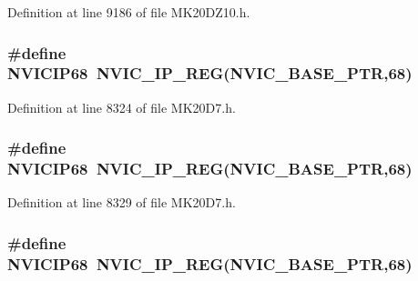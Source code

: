 Definition at line 9186 of file M\+K20\+D\+Z10.\+h.

\subsubsection[{\texorpdfstring{N\+V\+I\+C\+I\+P68}{NVICIP68}}]{\setlength{\rightskip}{0pt plus 5cm}\#define N\+V\+I\+C\+I\+P68~{\bf N\+V\+I\+C\+\_\+\+I\+P\+\_\+\+R\+EG}({\bf N\+V\+I\+C\+\_\+\+B\+A\+S\+E\+\_\+\+P\+TR},68)}\hypertarget{group___n_v_i_c___register___accessor___macros_ga55d3dd79ae137540f22a273a25272786}{}\label{group___n_v_i_c___register___accessor___macros_ga55d3dd79ae137540f22a273a25272786}


Definition at line 8324 of file M\+K20\+D7.\+h.

\subsubsection[{\texorpdfstring{N\+V\+I\+C\+I\+P68}{NVICIP68}}]{\setlength{\rightskip}{0pt plus 5cm}\#define N\+V\+I\+C\+I\+P68~{\bf N\+V\+I\+C\+\_\+\+I\+P\+\_\+\+R\+EG}({\bf N\+V\+I\+C\+\_\+\+B\+A\+S\+E\+\_\+\+P\+TR},68)}\hypertarget{group___n_v_i_c___register___accessor___macros_ga55d3dd79ae137540f22a273a25272786}{}\label{group___n_v_i_c___register___accessor___macros_ga55d3dd79ae137540f22a273a25272786}


Definition at line 8329 of file M\+K20\+D7.\+h.

\subsubsection[{\texorpdfstring{N\+V\+I\+C\+I\+P68}{NVICIP68}}]{\setlength{\rightskip}{0pt plus 5cm}\#define N\+V\+I\+C\+I\+P68~{\bf N\+V\+I\+C\+\_\+\+I\+P\+\_\+\+R\+EG}({\bf N\+V\+I\+C\+\_\+\+B\+A\+S\+E\+\_\+\+P\+TR},68)}\hypertarget{group___n_v_i_c___register___accessor___macros_ga55d3dd79ae137540f22a273a25272786}{}\label{group___n_v_i_c___register___accessor___macros_ga55d3dd79ae137540f22a273a25272786}


